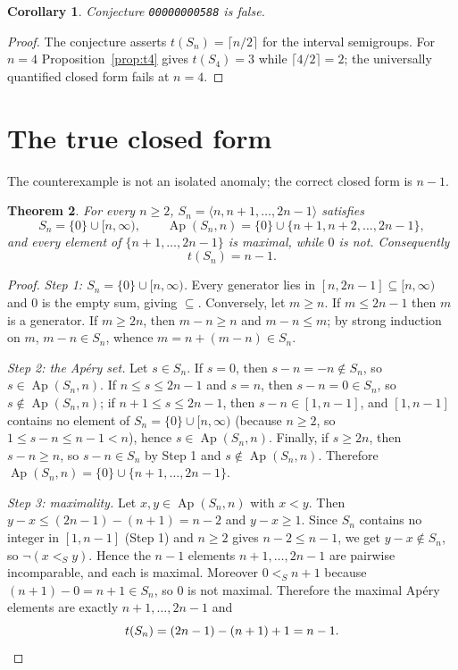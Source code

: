 \documentclass[11pt]{article}
\newtheorem{theorem}{Theorem}
\newtheorem{corollary}[theorem]{Corollary}
\theoremstyle{definition}
\theoremstyle{remark}
\newcommand{\Ap}{\operatorname{Ap}}
\newcommand{\gen}[1]{\langle #1 \rangle}
\begin{document}
\begin{corollary}
Conjecture \texttt{00000000588} is false.
\end{corollary}

\begin{proof}
The conjecture asserts $t(S_n) = \lceil n/2 \rceil$ for the interval
semigroups. For $n = 4$ Proposition~\ref{prop:t4} gives $t(S_4) = 3$ while
$\lceil 4/2 \rceil = 2$; the universally quantified closed form fails at
$n = 4$.
\end{proof}

\section{The true closed form}\label{sec:closedform}

The counterexample is not an isolated anomaly; the correct closed form is
$n - 1$.

\begin{theorem}\label{thm:main}
For every $n \ge 2$, $S_n = \gen{n, n+1, \dots, 2n-1}$ satisfies
\[
S_n = \{0\} \cup [n,\infty), \qquad
\Ap(S_n, n) = \{0\} \cup \{n+1, n+2, \dots, 2n-1\},
\]
and every element of $\{n+1, \dots, 2n-1\}$ is maximal, while $0$ is not.
Consequently
\[
t(S_n) = n - 1 .
\]
\end{theorem}

\begin{proof}
\emph{Step 1: $S_n = \{0\} \cup [n,\infty)$.} Every generator lies in
$[n, 2n-1] \subseteq [n,\infty)$ and $0$ is the empty sum, giving
$\subseteq$. Conversely, let $m \ge n$. If $m \le 2n-1$ then $m$ is a
generator. If $m \ge 2n$, then $m - n \ge n$ and $m - n \le m$; by strong
induction on $m$, $m - n \in S_n$, whence $m = n + (m-n) \in S_n$.

\emph{Step 2: the Apéry set.} Let $s \in S_n$. If $s = 0$, then
$s - n = -n \notin S_n$, so $s \in \Ap(S_n,n)$. If $n \le s \le 2n-1$ and
$s = n$, then $s - n = 0 \in S_n$, so $s \notin \Ap(S_n,n)$; if
$n+1 \le s \le 2n-1$, then $s - n \in [1, n-1]$, and $[1,n-1]$ contains no
element of $S_n = \{0\} \cup [n,\infty)$ (because $n \ge 2$, so
$1 \le s-n \le n-1 < n$), hence $s \in \Ap(S_n,n)$. Finally, if $s \ge 2n$,
then $s - n \ge n$, so $s - n \in S_n$ by Step 1 and
$s \notin \Ap(S_n,n)$. Therefore
$\Ap(S_n,n) = \{0\} \cup \{n+1,\dots,2n-1\}$.

\emph{Step 3: maximality.} Let $x, y \in \Ap(S_n,n)$ with $x < y$. Then
$y - x \le (2n-1) - (n+1) = n - 2$ and $y - x \ge 1$. Since $S_n$ contains no
integer in $[1, n-1]$ (Step 1) and $n \ge 2$ gives $n - 2 \le n - 1$, we get
$y - x \notin S_n$, so $\neg(x <_S y)$. Hence the $n-1$ elements
$n+1, \dots, 2n-1$ are pairwise incomparable, and each is maximal. Moreover
$0 <_S n+1$ because $(n+1) - 0 = n+1 \in S_n$, so $0$ is not maximal.
Therefore the maximal Apéry elements are exactly $n+1, \dots, 2n-1$ and
\[
t(S_n) = (2n-1) - (n+1) + 1 = n - 1 . \qedhere
\]
\end{proof}
\end{document}
